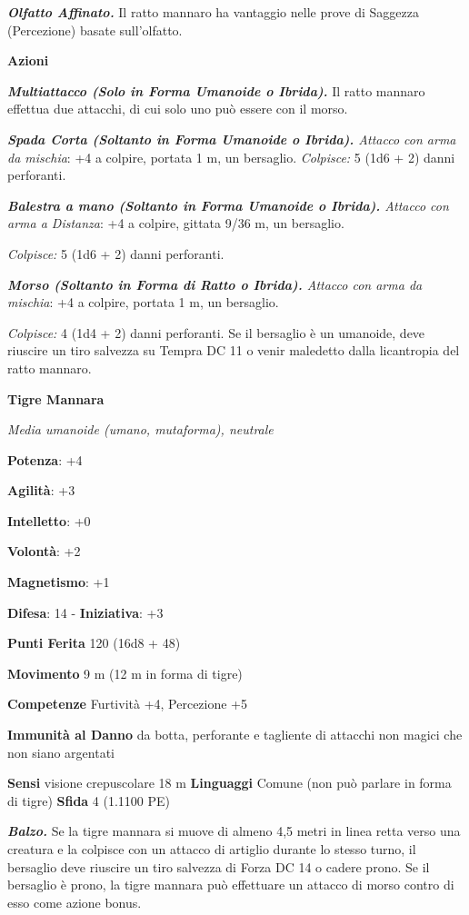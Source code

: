 \begin{multicols}{2}
\emph{\textbf{Olfatto Affinato.}} Il ratto mannaro ha vantaggio nelle
prove di Saggezza (Percezione) basate sull'olfatto.

\smallskip\textbf{Azioni}

\emph{\textbf{Multiattacco (Solo in Forma Umanoide o Ibrida).}} Il ratto
mannaro effettua due attacchi, di cui solo uno può essere con il morso.

\emph{\textbf{Spada Corta (Soltanto in Forma Umanoide o Ibrida).}
Attacco con arma da mischia}: +4 a colpire, portata 1 m, un bersaglio.
\emph{Colpisce:} 5 (1d6 + 2) danni perforanti.

\emph{\textbf{Balestra a mano (Soltanto in Forma Umanoide o Ibrida).}
Attacco con arma a Distanza}: +4 a colpire, gittata 9/36 m, un
bersaglio.

\emph{Colpisce:} 5 (1d6 + 2) danni perforanti.

\emph{\textbf{Morso (Soltanto in Forma di Ratto o Ibrida).} Attacco con
arma da mischia}: +4 a colpire, portata 1 m, un bersaglio.

\emph{Colpisce:} 4 (1d4 + 2) danni perforanti. Se il bersaglio è un
umanoide, deve riuscire un tiro salvezza su Tempra DC 11 o venir
maledetto dalla licantropia del ratto mannaro.



\textbf{Tigre Mannara}

\emph{Media umanoide (umano, mutaforma), neutrale}

\textbf{Potenza}: +4

\textbf{Agilità}: +3

\textbf{Intelletto}: +0

\textbf{Volontà}: +2

\textbf{Magnetismo}: +1

\textbf{Difesa}: 14 - \textbf{Iniziativa}: +3

\textbf{Punti Ferita} 120 (16d8 + 48)

\textbf{Movimento} 9 m (12 m in forma di tigre)

\textbf{Competenze} Furtività +4, Percezione +5

\textbf{Immunità al Danno} da botta, perforante e tagliente di
attacchi non magici che non siano argentati

\textbf{Sensi} visione crepuscolare 18 m
\textbf{Linguaggi} Comune (non può parlare in forma di tigre)
\textbf{Sfida} 4 (1.1100 PE)\smallskip

\emph{\textbf{Balzo.}} Se la tigre mannara si muove di almeno 4,5 metri
in linea retta verso una creatura e la colpisce con un attacco di
artiglio durante lo stesso turno, il bersaglio deve riuscire un tiro
salvezza di Forza DC 14 o cadere prono. Se il bersaglio è prono, la
tigre mannara può effettuare un attacco di morso contro di esso come
azione bonus.


\end{multicols}
